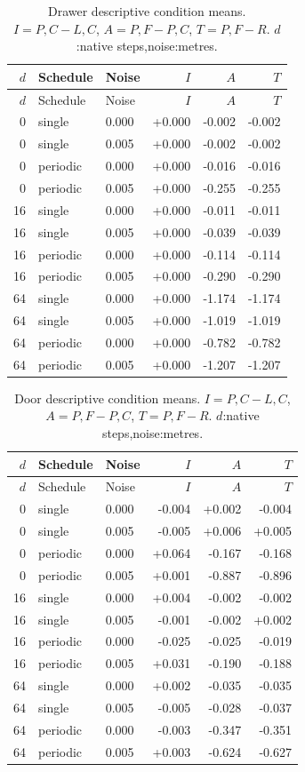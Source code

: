 \begin{longtable}{rllrrr}
\caption{Drawer descriptive condition means. $I=P,C-L,C$, $A=P,F-P,C$, $T=P,F-R$. $d$:native steps,noise:metres.}\label{tab:drawerbreak}\\
\toprule $d$ & Schedule & Noise & $I$ & $A$ & $T$\\\midrule\endfirsthead
\toprule $d$ & Schedule & Noise & $I$ & $A$ & $T$\\\midrule\endhead
0 & single & 0.000 & +0.000 & -0.002 & -0.002\\
0 & single & 0.005 & +0.000 & -0.002 & -0.002\\
0 & periodic & 0.000 & +0.000 & -0.016 & -0.016\\
0 & periodic & 0.005 & +0.000 & -0.255 & -0.255\\
16 & single & 0.000 & +0.000 & -0.011 & -0.011\\
16 & single & 0.005 & +0.000 & -0.039 & -0.039\\
16 & periodic & 0.000 & +0.000 & -0.114 & -0.114\\
16 & periodic & 0.005 & +0.000 & -0.290 & -0.290\\
64 & single & 0.000 & +0.000 & -1.174 & -1.174\\
64 & single & 0.005 & +0.000 & -1.019 & -1.019\\
64 & periodic & 0.000 & +0.000 & -0.782 & -0.782\\
64 & periodic & 0.005 & +0.000 & -1.207 & -1.207\\
\bottomrule\end{longtable}
\begin{longtable}{rllrrr}
\caption{Door descriptive condition means. $I=P,C-L,C$, $A=P,F-P,C$, $T=P,F-R$. $d$:native steps,noise:metres.}\label{tab:doorbreak}\\
\toprule $d$ & Schedule & Noise & $I$ & $A$ & $T$\\\midrule\endfirsthead
\toprule $d$ & Schedule & Noise & $I$ & $A$ & $T$\\\midrule\endhead
0 & single & 0.000 & -0.004 & +0.002 & -0.004\\
0 & single & 0.005 & -0.005 & +0.006 & +0.005\\
0 & periodic & 0.000 & +0.064 & -0.167 & -0.168\\
0 & periodic & 0.005 & +0.001 & -0.887 & -0.896\\
16 & single & 0.000 & +0.004 & -0.002 & -0.002\\
16 & single & 0.005 & -0.001 & -0.002 & +0.002\\
16 & periodic & 0.000 & -0.025 & -0.025 & -0.019\\
16 & periodic & 0.005 & +0.031 & -0.190 & -0.188\\
64 & single & 0.000 & +0.002 & -0.035 & -0.035\\
64 & single & 0.005 & -0.005 & -0.028 & -0.037\\
64 & periodic & 0.000 & -0.003 & -0.347 & -0.351\\
64 & periodic & 0.005 & +0.003 & -0.624 & -0.627\\
\bottomrule\end{longtable}
